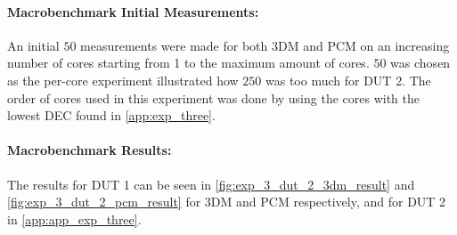 



\paragraph*{Macrobenchmark Initial Measurements:} An initial $50$ measurements were made for both 3DM and PCM on an increasing number of cores starting from 1 to the maximum amount of cores. $50$ was chosen as the per-core experiment illustrated how $250$ was too much for DUT 2. The order of cores used in this experiment was done by using the cores with the lowest DEC found in \cref{app:exp_three}.




\paragraph*{Macrobenchmark Results:} The results for DUT 1 can be seen in \cref{fig:exp_3_dut_2_3dm_result} and \cref{fig:exp_3_dut_2_pcm_result} for 3DM and PCM respectively, and for DUT 2 in \cref{app:app_exp_three}.
